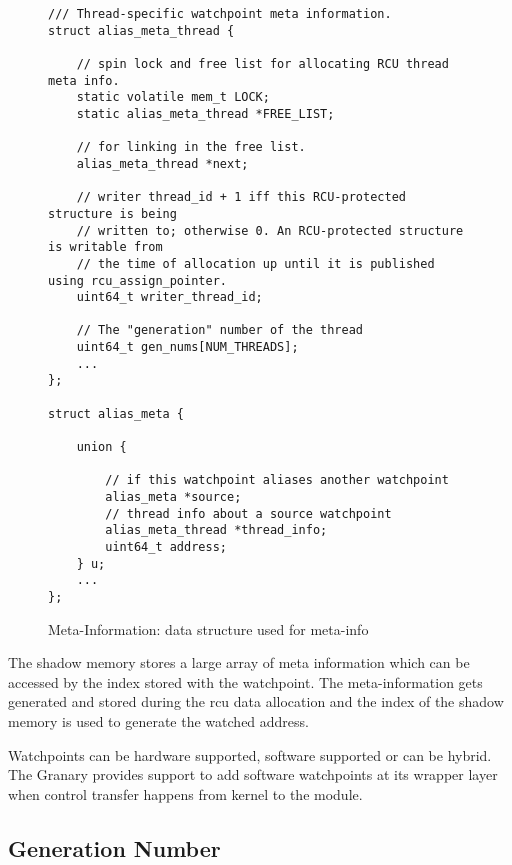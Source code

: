 \begin{figure}[h]
\centering
\begin{lstlisting}
/// Thread-specific watchpoint meta information.
struct alias_meta_thread {

    // spin lock and free list for allocating RCU thread meta info.
    static volatile mem_t LOCK;
    static alias_meta_thread *FREE_LIST;

    // for linking in the free list.
    alias_meta_thread *next;

    // writer thread_id + 1 iff this RCU-protected structure is being
    // written to; otherwise 0. An RCU-protected structure is writable from
    // the time of allocation up until it is published using rcu_assign_pointer.
    uint64_t writer_thread_id;

    // The "generation" number of the thread
    uint64_t gen_nums[NUM_THREADS];
    ...
};

struct alias_meta {

    union {

        // if this watchpoint aliases another watchpoint
        alias_meta *source;
        // thread info about a source watchpoint
        alias_meta_thread *thread_info;
        uint64_t address;
    } u;
    ...
}; 
\end{lstlisting}
\caption{Meta-Information: data structure used for meta-info}\label{fig:metainfo}
\end{figure}

The shadow memory stores a large array of meta information which can be accessed by the index stored with the watchpoint. The meta-information gets generated and stored during the rcu data allocation and the index of the shadow memory is used to generate the watched address. 




Watchpoints can be hardware supported, software supported or can be hybrid. The Granary provides support to add software watchpoints at its wrapper layer when control transfer happens from kernel to the module.

\subsection{Generation Number}
